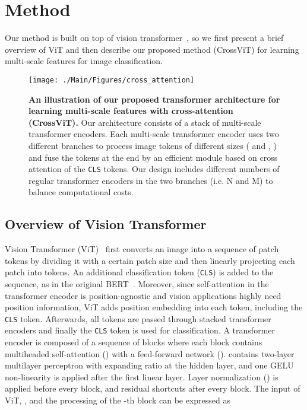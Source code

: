 \documentclass[10pt,twocolumn,letterpaper]{article}
\def\clstoken{\texttt{CLS}\xspace}
\def\ours{CrossViT\xspace}
\begin{document}
 \section{Method}
\label{sec:proposed}
Our method is built on top of vision transformer~\cite{ViT_dosovitskiy2021an}, so we first present a brief overview of ViT and then describe our proposed method (\ours) for learning multi-scale features for image classification.

\begin{figure}[tb!]
    \centering
    \texttt{[image: ./Main/Figures/cross\_attention]}
\caption{\textbf{An illustration of our proposed transformer architecture for learning multi-scale features with cross-attention (\ours).} Our architecture consists of a stack of  multi-scale transformer encoders. Each multi-scale transformer encoder uses two different branches to process image tokens of different sizes ( and , ) and fuse the tokens at the end by an efficient module based on cross attention of the \clstoken tokens. Our design includes different numbers of regular transformer encoders in the two branches (i.e. N and M) to balance computational costs. 
}
    \label{fig:cross_attention} 
\end{figure}

\subsection{Overview of Vision Transformer}


Vision Transformer (ViT)~\cite{ViT_dosovitskiy2021an} first converts an image into a sequence of patch tokens by dividing it with a certain patch size and then linearly projecting each patch into tokens.  An additional classification token (\clstoken) is added to the sequence, as in the original BERT~\cite{bert_devlin-etal-2019-bert}.
Moreover, since self-attention in the transformer encoder is position-agnostic and vision applications highly need position information, ViT adds position embedding into each token, including the \clstoken token. Afterwards, all tokens are passed through stacked transformer encoders and finally the \clstoken token is used for classification. A transformer encoder is composed of a sequence of blocks where each block contains multiheaded self-attention () with a feed-forward network (). 
 contains two-layer multilayer perceptron with expanding ratio  at the hidden layer, and one GELU non-linearity is applied after the first linear layer.
Layer normalization () is applied before every block, and residual shortcuts after every block. 
The input of ViT, , and the processing of the -th block can be expressed as
\end{document}
